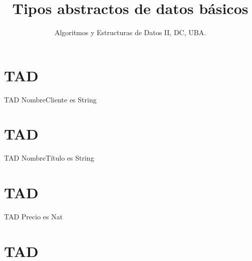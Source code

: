 \documentclass[10pt, a4paper]{article}
\author{Algoritmos y Estructuras de Datos II, DC, UBA.}
\date{}
\title{Tipos abstractos de datos b\'asicos}
\begin{document}
\thispagestyle{empty}

\maketitle
\tableofcontents

\newpage


\section{TAD }

\begin{tad}{}

TAD NombreCliente es String


\end{tad}


\section{TAD }

\begin{tad}{}

TAD NombreT\'itulo es String


\end{tad}

\section{TAD }

\begin{tad}{}

TAD Precio es Nat

\end{tad}




\section{TAD }
\end{document}
